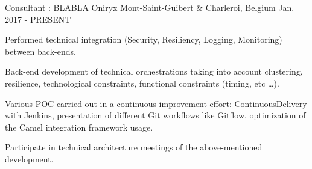 

\begin{cventries}

  \cventry
    {Consultant : BLABLA} %
    {Oniryx} %
    {Mont-Saint-Guibert \& Charleroi, Belgium} %
    {Jan. 2017 - PRESENT} %
    {
      \begin{cvitems} %
				\item {Performed technical integration (Security, Resiliency, Logging, Monitoring) between back-ends.}
				\item {Back-end development of technical orchestrations taking into account clustering, resilience, technological constraints, functional constraints (timing, etc \dots).}
				\item {Various POC carried out in a continuous improvement effort: ContinuousDelivery with Jenkins, presentation of different Git workflows like Gitflow, optimization of the Camel integration framework usage.}
				\item {Participate in technical architecture meetings of the above-mentioned development.}
      \end{cvitems}
    }




\end{cventries}
